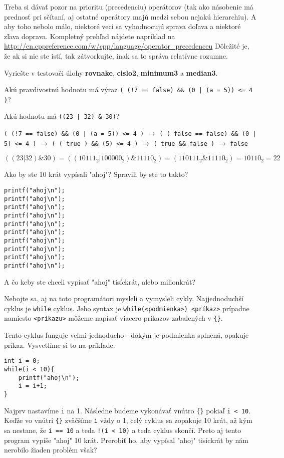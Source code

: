 Treba si dávať pozor na prioritu (precedenciu) operátorov (tak ako násobenie má
prednosť pri sčítaní, aj ostatné operátory majú medzi sebou nejakú hierarchiu).
A aby toho nebolo málo, niektoré veci sa vyhodnocujú sprava doľava a niektoré
zľava doprava. Kompletný prehľad nájdete napríklad na
\url{http://en.cppreference.com/w/cpp/language/operator\_precedenceu} Dôležité
je, že ak si nie ste istí, tak zátvorkujte, inak sa to správa relatívne
rozumne.

\medskip

Vyriešte v testovači úlohy \textbf{rovnake}, \textbf{cislo2}, \textbf{minimum3}
a \textbf{median3}.

\cvicenie Akú pravdivostnú hodnotu má výraz 
\verb'( (!7 == false) && (0 | (a = 5)) <= 4 )'?

\cvicenie Akú hodnotu má \verb!((23 | 32) & 30)!? 

\riesenie \verb'( (!7 == false) && (0 | (a = 5)) <= 4 )' $\rightarrow$
\verb'( ( false == false) && (0 | 5) <= 4 )' $\rightarrow$
\verb'( ( true ) && (5) <= 4 )' $\rightarrow$ \verb'( true && false )' $\rightarrow$ \verb'false'

\riesenie $((23 | 32) \& 30) = ((10111_2 | 100000_2) \& 11110_2) = (110111_2 \&
11110_2) = 10110_2 = 22$


Ako by ste 10 krát vypísali "ahoj"? Spravili by ste to takto?
\begin{lstlisting}
printf("ahoj\n");
printf("ahoj\n");
printf("ahoj\n");
printf("ahoj\n");
printf("ahoj\n");
printf("ahoj\n");
printf("ahoj\n");
printf("ahoj\n");
printf("ahoj\n");
printf("ahoj\n");
\end{lstlisting}
A čo keby ste chceli vypísať "ahoj" tisíckrát, alebo milionkrát?

Nebojte sa, aj na toto programátori mysleli a vymysleli cykly.  Najjednoduchší
cyklus je \verb!while! cyklus. Jeho syntax je 
\verb!while(<podmienka>) <príkaz>! prípadne namiesto \verb!<príkazu>! 
môžeme napísať viacero príkazov zabalených v \verb!{}!.

Tento cyklus funguje veľmi jednoducho - dokým je podmienka splnená, opakuje
príkaz. Vysvetlíme si to na príklade.
\begin{lstlisting}
int i = 0;
while(i < 10){
    printf("ahoj\n");
    i = i+1;
}
\end{lstlisting}
Najprv nastavíme \verb!i! na 1. Následne budeme vykonávať vnútro \verb!{}! pokiaľ 
\verb!i < 10!. Keďže vo vnútri \verb!{}! zväčšíme \verb!i! vždy o 1, celý cyklus sa zopakuje
10 krát, až kým sa nestane, že \verb!i == 10! a teda \verb'!(i < 10)' a teda cyklus
skončí.  Preto aj tento program vypíše "ahoj" 10 krát. Prerobiť ho, aby vypísal
"ahoj" tisíckrát by nám nerobilo žiaden problém však?


